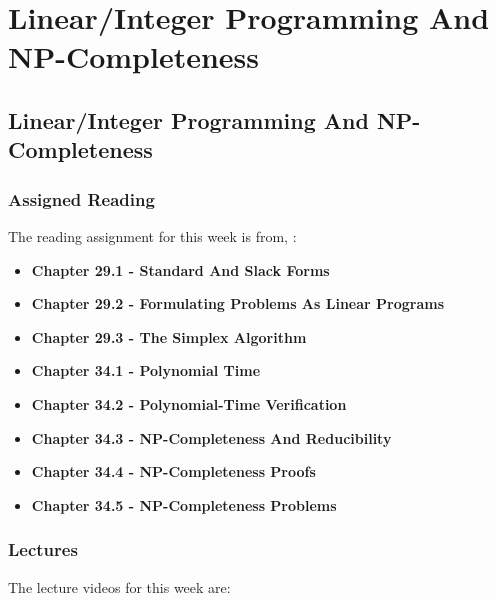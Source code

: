 \clearpage

\renewcommand{\ChapTitle}{Linear/Integer Programming And NP-Completeness}
\renewcommand{\SectionTitle}{Linear/Integer Programming And NP-Completeness}

\chapter{\ChapTitle}
\section{\SectionTitle}

\subsection{Assigned Reading}

The reading assignment for this week is from, \Textbook:

\begin{itemize}
    \item \textbf{Chapter 29.1 - Standard And Slack Forms}
    \item \textbf{Chapter 29.2 - Formulating Problems As Linear Programs}
    \item \textbf{Chapter 29.3 - The Simplex Algorithm}
    \item \textbf{Chapter 34.1 - Polynomial Time}
    \item \textbf{Chapter 34.2 - Polynomial-Time Verification}
    \item \textbf{Chapter 34.3 - NP-Completeness And Reducibility}
    \item \textbf{Chapter 34.4 - NP-Completeness Proofs}
    \item \textbf{Chapter 34.5 - NP-Completeness Problems}
\end{itemize}

\subsection{Lectures}

The lecture videos for this week are:

